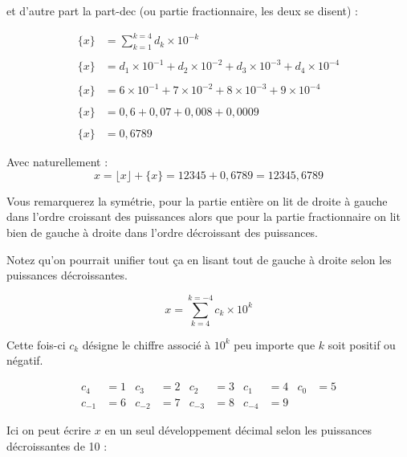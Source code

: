 \documentclass[a4paper,11pt]{book}
\begin{document}
et d'autre part la \gls{part-dec} (ou
partie fractionnaire, les deux se disent) :

\begin{align*}
\{ x \} &= \sum_{k = 1}^{k = 4}d_k\times 10^{-k}\\ \\
\{ x \} &= d_1\times 10^{-1} + d_2\times 10^{-2} + d_3\times 10^{-3} +
    d_4\times 10^{-4}\\ \\
\{ x \} &= 6\times 10^{-1} + 7\times 10^{-2} + 8\times 10^{-3} +
    9\times 10^{-4}\\ \\
\{ x \} &= 0,6 + 0,07 + 0,008 + 0,0009\\ \\
\{ x \} &= 0,6789
\end{align*}

\newpage

Avec naturellement :
\[x = \lfloor x \rfloor + \{ x \} = 12345 + 0,6789 = 12345,6789\]

Vous remarquerez la symétrie, pour la partie entière on lit de
droite à gauche dans l'ordre croissant des puissances alors que pour
la partie fractionnaire on lit bien de gauche à droite dans
l'ordre décroissant des puissances.


Notez qu'on pourrait unifier tout ça en lisant tout de gauche à
droite selon les puissances décroissantes.

\[x = \sum_{k = 4}^{k = -4}c_k\times 10^k\]

Cette fois-ci \(c_k\) désigne le chiffre associé à \(10^k\) peu importe
que \(k\) soit positif ou négatif.

\begin{align*}
c_4 &= 1 & c_3 &= 2& c_2 &= 3& c_1 &= 4& c_0 &= 5\\
c_{-1} &= 6& c_{-2} &= 7& c_{-3} &= 8& c_{-4} &= 9
\end{align*}



\newpage

Ici on peut écrire \(x\) en un seul développement
décimal selon les puissances
décroissantes de 10 :
\end{document}

